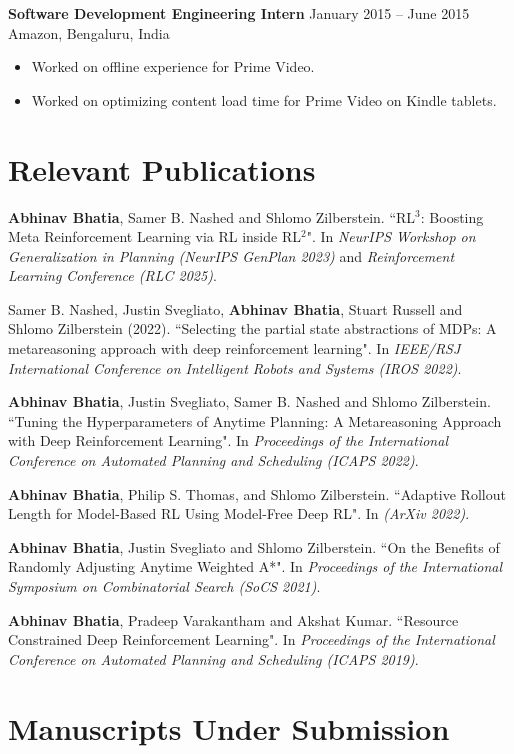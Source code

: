 \documentclass[letterpaper,11pt]{article}
\begin{document}
\vspace{-0.5em}
\textbf{Software Development Engineering Intern} \hfill January 2015 -- June 2015\\
Amazon, Bengaluru, India
\vspace{-1em}
\begin{itemize}
    \setlength\itemsep{0em}
  \item Worked on offline experience for Prime Video.
  \item Worked on optimizing content load time for Prime Video on Kindle tablets.
\end{itemize}

\section*{Relevant Publications}
\textbf{Abhinav Bhatia}, Samer B. Nashed and Shlomo Zilberstein. ``RL$^3$: Boosting Meta Reinforcement Learning via RL inside RL$^2$". In \textit{NeurIPS Workshop on Generalization in Planning (NeurIPS GenPlan 2023)} and \textit{Reinforcement Learning Conference (RLC 2025)}.

Samer B. Nashed, Justin Svegliato, \textbf{Abhinav Bhatia}, Stuart Russell and Shlomo Zilberstein (2022). ``Selecting the partial state abstractions of MDPs: A metareasoning approach with deep reinforcement learning". In \emph{IEEE/RSJ International Conference on Intelligent Robots and Systems (IROS 2022)}.

\textbf{Abhinav Bhatia}, Justin Svegliato, Samer B. Nashed and Shlomo Zilberstein. ``Tuning the Hyperparameters of Anytime Planning: A Metareasoning Approach with Deep Reinforcement Learning". In \textit{Proceedings of the International Conference on Automated Planning and Scheduling (ICAPS 2022)}.

\textbf{Abhinav Bhatia}, Philip S. Thomas, and Shlomo Zilberstein. ``Adaptive Rollout Length for Model-Based RL Using Model-Free Deep RL". In \textit{(ArXiv 2022)}.

\textbf{Abhinav Bhatia}, Justin Svegliato and Shlomo Zilberstein. ``On the Benefits of Randomly Adjusting Anytime Weighted A*". In \textit{Proceedings of the International Symposium on Combinatorial Search (SoCS 2021)}.

\textbf{Abhinav Bhatia}, Pradeep Varakantham and Akshat Kumar. ``Resource Constrained Deep Reinforcement Learning". In \textit{Proceedings of the International Conference on Automated Planning and Scheduling (ICAPS 2019)}.

\section*{Manuscripts Under Submission}
\end{document}
